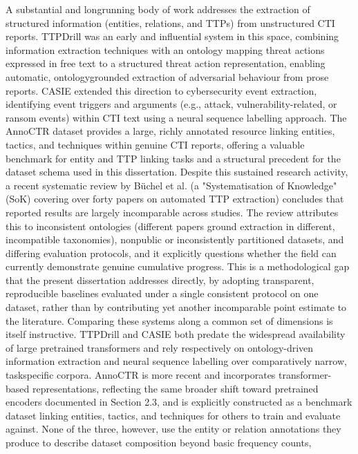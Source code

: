 \documentclass[12pt,a4paper]{report}
\begin{document}
A substantial and longrunning body of work addresses the extraction of
structured information (entities, relations, and TTPs) from unstructured
CTI reports. TTPDrill
\cite{husari2017ttpdrill}
was an early and influential system in this space, combining information
extraction techniques with an ontology mapping threat actions expressed
in free text to a structured threat action representation, enabling
automatic, ontologygrounded extraction of adversarial behaviour from
prose reports. CASIE
\cite{casie2020}
extended this direction to cybersecurity event extraction, identifying
event triggers and arguments (e.g., attack, vulnerability-related, or
ransom events) within CTI text using a neural sequence labelling
approach. The AnnoCTR dataset provides a large, richly annotated
resource linking entities, tactics, and techniques within genuine CTI
reports, offering a valuable benchmark for entity and TTP linking tasks
and a structural precedent for the dataset schema used in this
dissertation. Despite this sustained research activity, a recent
systematic review by Büchel et al.
\cite{buechel2025sok}
(a "Systematisation of Knowledge" (SoK) covering over forty papers on
automated TTP extraction) concludes that reported results are largely
incomparable across studies. The review attributes this to inconsistent
ontologies (different papers ground extraction in different,
incompatible taxonomies), nonpublic or inconsistently partitioned
datasets, and differing evaluation protocols, and it explicitly
questions whether the field can currently demonstrate genuine cumulative
progress. This is a methodological gap that the present dissertation
addresses directly, by adopting transparent, reproducible baselines
evaluated under a single consistent protocol on one dataset, rather than
by contributing yet another incomparable point estimate to the
literature. Comparing these systems along a common set of dimensions is
itself instructive. TTPDrill and CASIE both predate the widespread
availability of large pretrained transformers and rely respectively on
ontology-driven information extraction and neural sequence labelling
over comparatively narrow, taskspecific corpora. AnnoCTR is more recent
and incorporates transformer-based representations, reflecting the same
broader shift toward pretrained encoders documented in Section 2.3, and
is explicitly constructed as a benchmark dataset linking entities,
tactics, and techniques for others to train and evaluate against. None
of the three, however, use the entity or relation annotations they
produce to describe dataset composition beyond basic frequency counts,
\end{document}
